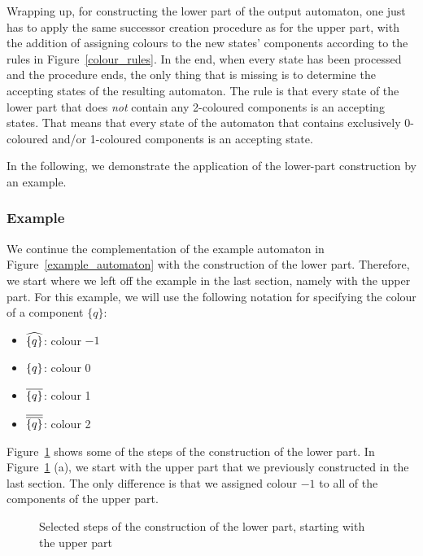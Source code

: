 Wrapping up, for constructing the lower part of the output automaton, one just has to apply the same successor creation procedure as for the upper part, with the addition of assigning colours to the new states' components according to the rules in Figure~\ref{colour_rules}. In the end, when every state has been processed and the procedure ends, the only thing that is missing is to determine the accepting states of the resulting automaton. The rule is that every state of the lower part that does \textit{not} contain any 2-coloured components is an accepting states. That means that every state of the automaton that contains exclusively 0-coloured and/or 1-coloured components is an accepting state.

In the following, we demonstrate the application of the lower-part construction by an example.


\subsubsection{Example}
We continue the complementation of the example automaton in Figure~\ref{example_automaton} with the construction of the lower part. Therefore, we start where we left off the example in the last section, namely with the upper part. For this example, we will use the following notation for specifying the colour of a component $\{q\}$:
\begin{itemize}
\item $\cl^{\{q\}}$: colour $-1$
\item $\cl0{\{q\}}$: colour 0   %
\item $\cl1{\{q\}}$: colour 1   %
\item $\cl2{\{q\}}$: colour 2
\end{itemize}

Figure~\ref{steps_lower} shows some of the steps of the construction of the lower part. In Figure~\ref{steps_lower} (a), we start with the upper part that we previously constructed in the last section. The only difference is that we assigned colour $-1$ to all of the components of the upper part.

\begin{figure}[htb]
\centering
  \begin{subfigure}[t]{0.49\textwidth}
  \centering
  \ComplementA
  \caption{}
  \end{subfigure}
  \hfill
  \begin{subfigure}[t]{0.49\textwidth}
  \centering
  \ComplementB
  \caption{}
  \end{subfigure}

  \begin{subfigure}[t]{0.49\textwidth}
  \centering
  \ComplementC
  \caption{}
  \end{subfigure}
  \hfill
  \begin{subfigure}[t]{0.49\textwidth}
  \centering
  \ComplementD
  \caption{}
  \end{subfigure}
\caption{Selected steps of the construction of the lower part, starting with the upper part }
\label{steps_lower}
\end{figure}

